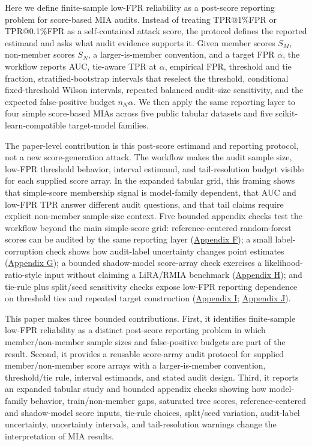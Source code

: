 \documentclass[
  10pt,
  twocolumn]{article}
\begin{document}
Here we define finite-sample low-FPR reliability as a post-score reporting problem for score-based MIA audits. Instead of treating TPR@1\%FPR or TPR@0.1\%FPR as a self-contained attack score, the protocol defines the reported estimand and asks what audit evidence supports it. Given member scores \(S_M\), non-member scores \(S_N\), a larger-is-member convention, and a target FPR \(\alpha\), the workflow reports AUC, tie-aware TPR at \(\alpha\), empirical FPR, threshold and tie fraction, stratified-bootstrap intervals that reselect the threshold, conditional fixed-threshold Wilson intervals, repeated balanced audit-size sensitivity, and the expected false-positive budget \(n_N\alpha\). We then apply the same reporting layer to four simple score-based MIAs across five public tabular datasets and five scikit-learn-compatible target-model families.

The paper-level contribution is this post-score estimand and reporting protocol, not a new score-generation attack. The workflow makes the audit sample size, low-FPR threshold behavior, interval estimand, and tail-resolution budget visible for each supplied score array. In the expanded tabular grid, this framing shows that simple-score membership signal is model-family dependent, that AUC and low-FPR TPR answer different audit questions, and that tail claims require explicit non-member sample-size context. Five bounded appendix checks test the workflow beyond the main simple-score grid: reference-centered random-forest scores can be audited by the same reporting layer (\protect\hyperlink{appendix-f-reference-centered-score-check}{Appendix F}); a small label-corruption check shows how audit-label uncertainty changes point estimates (\protect\hyperlink{appendix-g-label-uncertainty-check}{Appendix G}); a bounded shadow-model score-array check exercises a likelihood-ratio-style input without claiming a LiRA/RMIA benchmark (\protect\hyperlink{appendix-h-bounded-shadow-model-score-check}{Appendix H}); and tie-rule plus split/seed sensitivity checks expose low-FPR reporting dependence on threshold ties and repeated target construction (\protect\hyperlink{appendix-i-tie-rule-sensitivity}{Appendix I}; \protect\hyperlink{appendix-j-splitseed-sensitivity}{Appendix J}).

This paper makes three bounded contributions. First, it identifies finite-sample low-FPR reliability as a distinct post-score reporting problem in which member/non-member sample sizes and false-positive budgets are part of the result. Second, it provides a reusable score-array audit protocol for supplied member/non-member score arrays with a larger-is-member convention, threshold/tie rule, interval estimands, and stated audit design. Third, it reports an expanded tabular study and bounded appendix checks showing how model-family behavior, train/non-member gaps, saturated tree scores, reference-centered and shadow-model score inputs, tie-rule choices, split/seed variation, audit-label uncertainty, uncertainty intervals, and tail-resolution warnings change the interpretation of MIA results.
\end{document}
